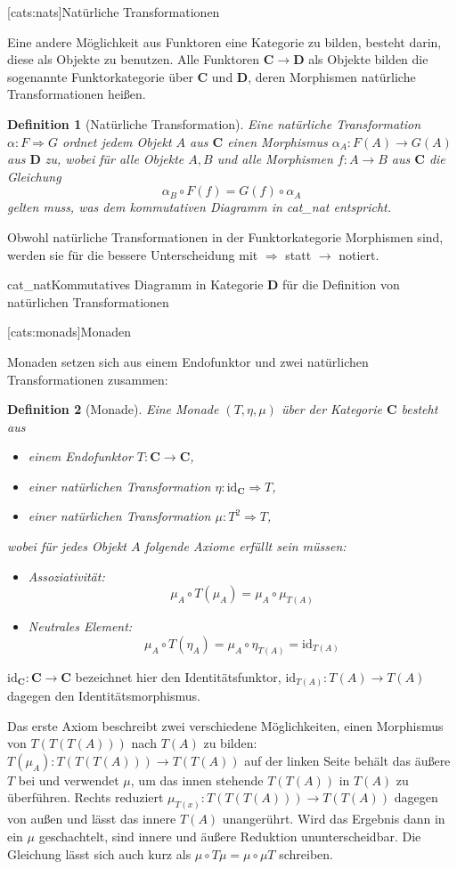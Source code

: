 \documentclass[12pt, a4paper, bibgerm]{scrbook}
\newcommand\lsection{}
\newcommand\abb{}
\newcommand\fig{}
\newcommand\ato{\rightarrow} %
\newcommand\nto{\Rightarrow} %
\newtheorem{defini}{Definition}
\newcommand{\defi}[2]{%
  \begin{defini}[#1]
    \label{def:#1}
    #2
  \end{defini}
}
\begin{document}
\lsection[cats:nats]{Natürliche Transformationen}

Eine andere Möglichkeit aus Funktoren eine Kategorie zu bilden,
besteht darin, diese als Objekte zu benutzen. Alle Funktoren $\mathbf{C}
\ato \mathbf{D}$ als Objekte bilden die sogenannte Funktorkategorie über
$\mathbf{C}$ und $\mathbf{D}$, deren Morphismen natürliche
Transformationen heißen.

\defi{Natürliche Transformation}{Eine natürliche Transformation $\alpha\colon{}F \nto
G$ ordnet jedem Objekt $A$ aus $\mathbf{C}$ einen Morphismus
$\alpha_A:F(A) \ato G(A)$ aus $\mathbf{D}$ zu, wobei für alle Objekte
$A,B$ und alle Morphismen $f:A \ato B$ aus $\mathbf{C}$ die
Gleichung
$$\alpha_B \circ F(f) = G(f) \circ \alpha_A $$
gelten muss, was dem kommutativen Diagramm in \abb{cat_nat}
entspricht.
}

Obwohl natürliche Transformationen in der Funktorkategorie Morphismen
sind, werden sie für die bessere Unterscheidung mit $\nto$ statt
$\ato$ notiert.

\fig{cat_nat}{Kommutatives Diagramm in Kategorie $\mathbf{D}$ für die Definition von
  natürlichen Transformationen}

\lsection[cats:monads]{Monaden}

Monaden setzen sich aus einem Endofunktor und zwei natürlichen
Transformationen zusammen:
\defi{Monade}{Eine Monade $(T,\eta,\mu)$ über der Kategorie $\mathbf{C}$ besteht aus
  \begin{itemize}
  \item einem Endofunktor $T:\mathbf{C} \ato \mathbf{C}$,
  \item einer natürlichen Transformation $\eta:\mathrm{id}_{\mathbf{C}} \nto T$,
  \item einer natürlichen Transformation $\mu:T^2 \nto T$,
  \end{itemize}
wobei für jedes Objekt $A$ folgende Axiome erfüllt sein müssen:
\begin{itemize}
\item Assoziativität: $$\mu_A \circ T(\mu_A) = \mu_A \circ \mu_{T(A)}$$
\item Neutrales Element: $$\mu_A \circ T(\eta_A) = \mu_A \circ \eta_{T(A)} = \mathrm{id}_{T(A)}$$
\end{itemize}
} $\mathrm{id}_\mathbf{C}:\mathbf{C} \ato \mathbf{C}$ bezeichnet hier
den Identitätsfunktor, $\mathrm{id}_{T(A)}:T(A) \ato T(A)$ dagegen den
Identitätsmorphismus. 

Das erste Axiom beschreibt zwei verschiedene Möglichkeiten, einen
Morphismus von $T(T(T(A)))$ nach $T(A)$ zu bilden: $T(\mu_A):T(T(T(A)))
\ato T(T(A))$ auf der linken Seite behält das äußere $T$ bei und
verwendet $\mu$, um das innen stehende $T(T(A))$ in $T(A)$ zu
überführen. Rechts reduziert $\mu_{T(x)}:T(T(T(A))) \ato T(T(A))$
dagegen von außen und lässt das innere $T(A)$ unangerührt. Wird das
Ergebnis dann in ein $\mu$ geschachtelt, sind innere und äußere
Reduktion ununterscheidbar. Die Gleichung lässt sich auch kurz als $\mu
\circ T \mu = \mu \circ \mu T$ schreiben.
\end{document}

